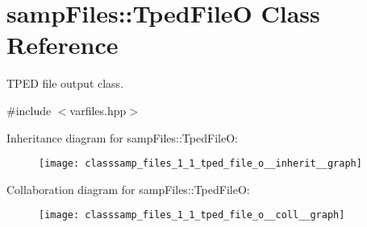 \hypertarget{classsamp_files_1_1_tped_file_o}{}\section{samp\+Files\+:\+:Tped\+FileO Class Reference}
\label{classsamp_files_1_1_tped_file_o}


T\+P\+ED file output class.  




{\ttfamily \#include $<$varfiles.\+hpp$>$}



Inheritance diagram for samp\+Files\+:\+:Tped\+FileO\+:\nopagebreak
\begin{figure}[H]
\begin{center}
\leavevmode
\texttt{[image: classsamp\_files\_1\_1\_tped\_file\_o\_\_inherit\_\_graph]}
\end{center}
\end{figure}


Collaboration diagram for samp\+Files\+:\+:Tped\+FileO\+:\nopagebreak
\begin{figure}[H]
\begin{center}
\leavevmode
\texttt{[image: classsamp\_files\_1\_1\_tped\_file\_o\_\_coll\_\_graph]}
\end{center}
\end{figure}

